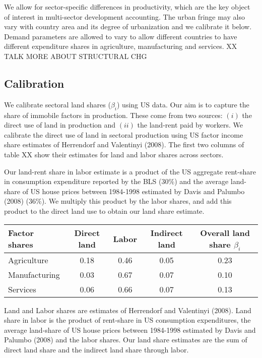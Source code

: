 \documentclass[12pt]{article}
\begin{document}
We allow for sector-specific differences in productivity, which are the key object of interest in multi-sector development accounting. The urban fringe may also vary with country area and its degree of urbanization and we calibrate it below. Demand parameters are allowed to vary to allow different countries to have different expenditure shares in agriculture, manufacturing and services. XX TALK MORE ABOUT STRUCTURAL CHG

\subsection{Calibration}

We calibrate sectoral land shares ($\beta_i$) using US data. Our aim is to capture the share of immobile factors in production. These come from two sources: $(i)$ the direct use of land in production and $(ii)$ the land-rent paid by workers. We calibrate the direct use of land in sectoral production using US factor income share estimates of Herrendorf and Valentinyi (2008). The first two columns of table XX show their estimates for land and labor shares across sectors.

Our land-rent share in labor estimate is a product of the US aggregate rent-share in consumption expenditure reported by the BLS ($30\%$) and the average land-share of US house prices between 1984-1998 estimated by Davis and Palumbo (2008) (36\%). We multiply this product by the labor shares, and add this product to the direct land use to obtain our land share estimate.

\begin{table}[h!] \center
\begin{tabular}{l|ccc|c}
\hline 
Factor shares & Direct land & Labor & Indirect land & Overall land share $\beta_i$ \\ \hline
Agriculture & 0.18 & 0.46  & 0.05 & 0.23 \\
Manufacturing& 0.03 & 0.67 & 0.07 & 0.10  \\
Services    &  0.06 & 0.66 & 0.07 & 0.13 \\ \hline 
\end{tabular}

\noindent \footnotesize{Land and Labor shares are estimates of Herrendorf and Valentinyi (2008). Land share in labor is the product of rent-share in US consumption expenditures, the average land-share of US house prices between 1984-1998 estimated by Davis and Palumbo (2008) and the labor shares. Our land share estimates are the sum of direct land share and the indirect land share through labor.}
\end{table}
\end{document}
